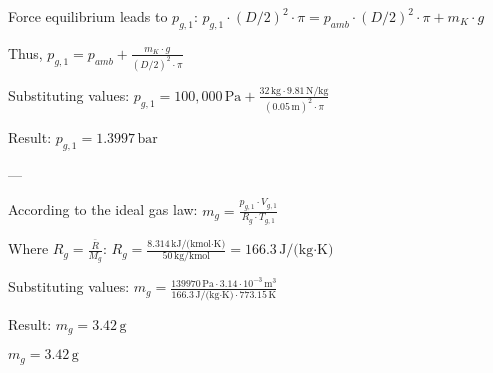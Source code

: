 Force equilibrium leads to \( p_{g,1} \):  
\( p_{g,1} \cdot (D / 2)^2 \cdot \pi = p_{amb} \cdot (D / 2)^2 \cdot \pi + m_K \cdot g \)  

Thus,  
\( p_{g,1} = p_{amb} + \frac{m_K \cdot g}{(D / 2)^2 \cdot \pi} \)  

Substituting values:  
\( p_{g,1} = 100{,}000 \, \text{Pa} + \frac{32 \, \text{kg} \cdot 9.81 \, \text{N/kg}}{(0.05 \, \text{m})^2 \cdot \pi} \)  

Result:  
\( p_{g,1} = 1.3997 \, \text{bar} \)  

---

According to the ideal gas law:  
\( m_g = \frac{p_{g,1} \cdot V_{g,1}}{R_g \cdot T_{g,1}} \)  

Where \( R_g = \frac{\bar{R}}{M_g} \):  
\( R_g = \frac{8.314 \, \text{kJ/(kmol·K)}}{50 \, \text{kg/kmol}} = 166.3 \, \text{J/(kg·K)} \)  

Substituting values:  
\( m_g = \frac{139970 \, \text{Pa} \cdot 3.14 \cdot 10^{-3} \, \text{m}^3}{166.3 \, \text{J/(kg·K)} \cdot 773.15 \, \text{K}} \)  

Result:  
\( m_g = 3.42 \, \text{g} \)  

\( m_g = 3.42 \, \text{g} \)
